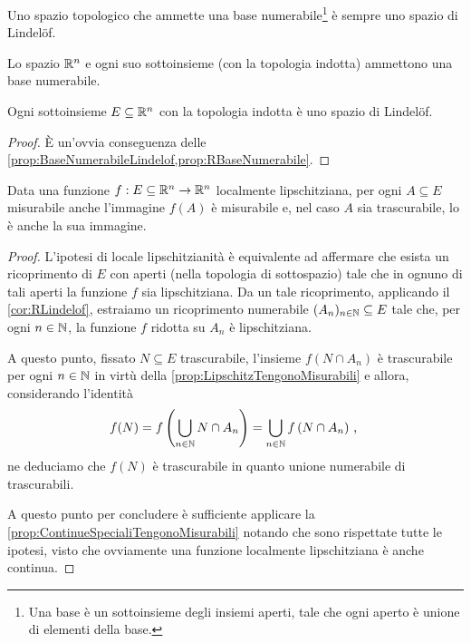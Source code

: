 \begin{proposition}\label{prop:BaseNumerabileLindelof}
	Uno spazio topologico che ammette una base numerabile\footnote{Una base è un sottoinsieme degli insiemi aperti, tale che ogni aperto è unione di elementi della base.} è sempre uno spazio di Lindelöf.
\end{proposition}

\begin{proposition}\label{prop:RBaseNumerabile}
	Lo spazio $\mathbb R^n$ e ogni suo sottoinsieme (con la topologia indotta) ammettono una base numerabile.
\end{proposition}

\begin{corollary}\label{cor:RLindelof}
	Ogni sottoinsieme $E\subseteq \mathbb R^n$ con la topologia indotta è uno spazio di Lindelöf.
\end{corollary}
\begin{proof}
	È un'ovvia conseguenza delle \cref{prop:BaseNumerabileLindelof,prop:RBaseNumerabile}.
\end{proof}

\begin{corollary}\label{cor:LocLipschitzTengonoMisurabili}
	Data una funzione $f:E\subseteq \mathbb R^n\to\mathbb R^n$ localmente lipschitziana, per ogni $A\subseteq E$ misurabile anche l'immagine $f(A)$ è misurabile e, nel caso $A$ sia trascurabile, lo è anche la sua immagine.
\end{corollary}
\begin{proof}
	L'ipotesi di locale lipschitzianità è equivalente ad affermare che esista un ricoprimento di $E$ con aperti (nella topologia di sottospazio) tale che in ognuno di tali aperti la funzione $f$ sia lipschitziana. 
	Da un tale ricoprimento, applicando il \cref{cor:RLindelof}, estraiamo un ricoprimento numerabile $(A_n)_{n\in\mathbb N}\subseteq E$ tale che, per ogni $n\in\mathbb N$, la funzione $f$ ridotta su $A_n$ è lipschitziana.
	
	A questo punto, fissato $N\subseteq E$ trascurabile, l'insieme $f(N\cap A_n)$ è trascurabile per ogni $n\in\mathbb N$ in virtù della \cref{prop:LipschitzTengonoMisurabili} e allora,  considerando l'identità
	\begin{equation*}
		f(N)=f\left(\bigcup_{n\in\mathbb N} N\cap A_n \right)= \bigcup_{n\in\mathbb N} f\left(N\cap A_n\right)\, \text{, }
	\end{equation*}
	ne deduciamo che $f(N)$ è trascurabile in quanto unione numerabile di trascurabili.
	
	A questo punto per concludere è sufficiente applicare la \cref{prop:ContinueSpecialiTengonoMisurabili} notando che sono rispettate tutte le ipotesi, visto che ovviamente una funzione localmente lipschitziana è anche continua.
\end{proof}


